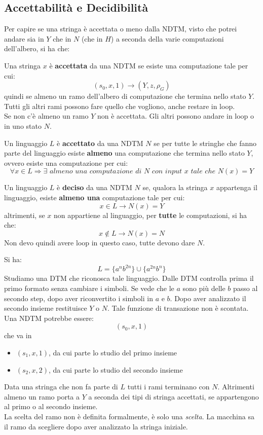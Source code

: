 \subsection{Accettabilità e Decidibilità}
Per capire se una stringa è accettata o meno dalla NDTM, visto che potrei andare
sia in $Y$ che in $N$ (che in $H$) a seconda della varie computazioni
dell'albero, si ha che:
\begin{definizione}
  Una stringa $x$ è \textbf{accettata} da una NDTM se esiste una computazione
  tale per cui:
  \[(s_0,x,1)\to(Y, z, \rho_G)\]
  quindi se almeno un ramo dell'albero di computazione che termina nello stato
  $Y$. Tutti gli altri rami possono fare quello che vogliono, anche restare in
  loop.\\
  Se non c'è almeno un ramo $Y$ non è accettata. Gli altri possono andare in
  loop o in uno stato $N$.
\end{definizione}
\begin{definizione}
  Un linguaggio $L$ è \textbf{accettato} da una NDTM $N$ se per tutte le
  stringhe che fanno parte del linguaggio esiste \textbf{almeno} una computazione che
  termina nello stato $Y$, ovvero esiste una computazione per cui:
  \[\forall x\in L\Rightarrow \exists\,\,almeno\,\, una\,\, computazione\,\, di\,\, N\,\, con\,\, input\,\, x\,\, tale\,\, che\,\, N(x)=Y\]
\end{definizione}
\begin{definizione}
  Un linguaggio $L$ è \textbf{deciso} da una NDTM $N$ se, qualora la stringa $x$
  appartenga il linguaggio, esiste \textbf{almeno una} computazione tale per
  cui: 
  \[x\in L\rightarrow N(x)=Y\]
  altrimenti, se $x$ non appartiene al linguaggio, per \textbf{tutte} le
  computazioni, si ha che: 
  \[x\not\in L \rightarrow N(x)=N\]
  Non devo quindi avere loop in questo caso, tutte devono dare $N$.
\end{definizione}
\begin{esempio}
  Si ha:
  \[L=\{a^nb^{2n}\}\cup\{a^{2n}b^n\}\]
  Studiamo una DTM che riconosca tale linguaggio. Dalle DTM controlla prima il
  primo formato senza cambiare i simboli. Se vede che le $a$ sono più delle $b$
  passo al secondo step, dopo aver riconvertito i simboli in $a$ e $b$. Dopo
  aver analizzato il secondo insieme restituisce $Y$ o $N$. Tale funzione di
  transazione non è scontata.\\
  Una NDTM potrebbe essere:
  \[(s_0,x,1)\]
  che va in
  \begin{itemize}
    \item $(s_1,x,1)$, da cui parte lo studio del primo insieme
    \item $(s_2,x,2)$, da cui parte lo studio del secondo insieme
  \end{itemize}
  Data una stringa che non fa parte di $L$ tutti i rami terminano con
  $N$. Altrimenti almeno un ramo porta a $Y$ a seconda dei tipi di stringa
  accettati, se appartengono al primo o al secondo insieme. \\
  La scelta del ramo non è definita formalmente, è solo una \textit{scelta}. La
  macchina sa il ramo da scegliere dopo aver analizzato la stringa iniziale.
\end{esempio}
